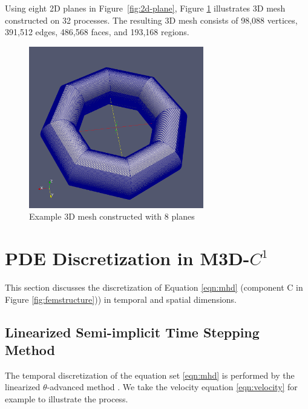 \documentclass[11pt]{article}  %
\begin{document}
Using eight 2D planes in Figure~\ref{fig:2d-plane}, Figure \ref{fig:3d-plane} illustrates 3D mesh constructed on 32 processes. The resulting 3D mesh consists of 98,088 vertices, 391,512 edges, 486,568 faces, and 193,168 regions. 

\begin{figure}
\center
\includegraphics[width=3in]{fig/3d.png}
\caption{\small{Example 3D mesh constructed with 8 planes}}
\label{fig:3d-plane}
\end{figure}


\section{PDE Discretization in M3D-$C^1$} \label{sec:m3dc1_dis}
This section discusses the discretization of Equation \ref{eqn:mhd} (component C in Figure \ref{fig:femstructure})) in temporal and spatial dimensions.
\subsection{Linearized Semi-implicit Time Stepping Method} \label{sec:timestep}
The temporal discretization of the equation set \ref{eqn:mhd} is performed by the linearized $\theta$-advanced method \cite{ferraro2009calculations}. We take the velocity equation \ref{eqn:velocity} for example to illustrate the process.
\end{document}
